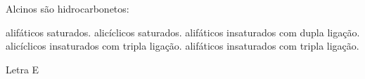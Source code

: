 \documentclass[10pt]{scrartcl}
\author{fabio}
\date{\today}
\title{}
\def\disciplina{Química}
\begin{document}
\twocolumn[

%




%

\smallbreak
\medbreak
\par\vspace{2ex}]%






\begin{exercise}[points=1.0]
Alcinos são hidrocarbonetos:
\begin{choice}
\choice alifáticos saturados.
\choice alicíclicos saturados.
\choice alifáticos insaturados com dupla ligação.
\choice alicíclicos insaturados com tripla ligação.
\choice alifáticos insaturados com tripla ligação.
\end{choice}
\end{exercise}
\begin{solution}
Letra E
\end{solution}
\end{document}
